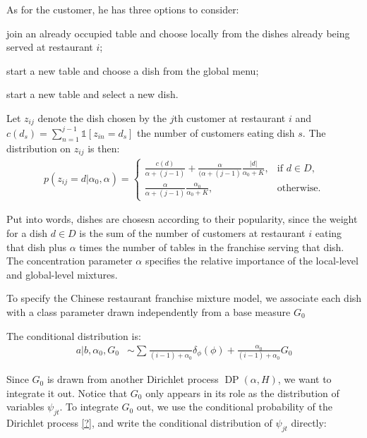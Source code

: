 As for the customer, he has three options to consider:
\begin{enumerate*} 
\item join an already occupied table and choose locally from the dishes already being served at restaurant $i$;
\item start a new table and choose a dish from the global menu;
\item start a new table and select a new dish.
\end{enumerate*}
Let $z_{ij}$ denote the dish chosen by the $j$th customer at restaurant $i$ and $c(d_s) = \sum_{n=1}^{j-1}\mathbb{1}[z_{in}=d_s]$ the number of customers eating dish $s$. The distribution on $z_{ij}$ is then:
\begin{align}
	p(z_{ij} = d | \alpha_0, \alpha ) = 
    \begin{cases}
    	\frac{c(d)}{\alpha+(j-1)}+\frac{\alpha}{(\alpha+(j-1)}\frac{|d|}{\alpha_0 + K}, & \text{if }d\in D,\\
	    \frac{\alpha}{\alpha+(j-1)}\frac{\alpha_0}{\alpha_0 + K}, & \text{otherwise.}
    \end{cases}
\end{align}

Put into words, dishes are chosesn according to their popularity, since the weight for a dish $d\in D$ is the sum of the number of customers at restaurant $i$ eating that dish plus $\alpha$ times the number of tables in the franchise serving that dish. The concentration parameter $\alpha$ specifies the relative importance of the local-level and global-level mixtures.

To specify the Chinese restaurant franchise mixture model, we associate each dish with a class parameter drawn independently from a base measure $G_0$

The conditional distribution is:
\begin{align}
	a | b, \alpha_0, G_0 &\sim \sum_{}^{} \frac{}{(i-1)+\alpha_0}\delta_\phi(\phi) + \frac{\alpha_0}{(i-1)+\alpha_0}G_0
\end{align}

Since $G_0$ is drawn from another Dirichlet process $\operatorname{DP}(\alpha, H)$, we want to integrate it out. Notice that $G_0$ only appears in its role as the distribution of variables $\psi_{jt}$. To integrate $G_0$ out, we use the conditional probability of the Dirichlet process \cref{?}, and write the conditional distribution of $\psi_{jt}$ directly:
\begin{align}
\end{align}

